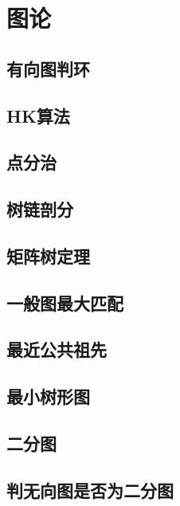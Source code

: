 \documentclass[10pt,a4paper]{article}
\begin{document}
\section{图论}
\subsection{有向图判环}
\begin{spacing}{1.5}

\end{spacing}
\subsection{HK算法}

\subsection{点分治}

\subsection{树链剖分}

\subsection{矩阵树定理}

\subsection{一般图最大匹配}

\subsection{最近公共祖先}

\subsection{最小树形图}

\subsection{二分图}
\begin{spacing}{1.5}

\end{spacing}
\subsection{判无向图是否为二分图}
\begin{spacing}{1.5}

\end{spacing}
\end{document}
